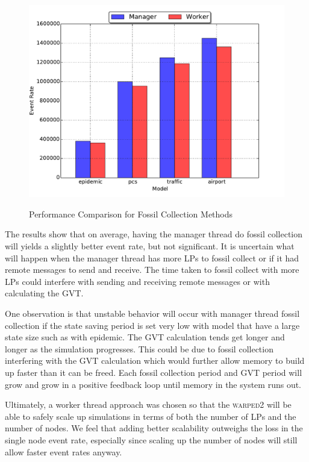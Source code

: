 \documentclass[11pt]{book}
\begin{document}
\begin{figure}
  \centering
  \includegraphics[width=\textwidth,quiet]{figs/fossil_collection/event_rates.pdf}\\
  \caption{Performance Comparison for Fossil Collection Methods}\label{fc_times}
\end{figure}

The results show that on average, having the manager thread do fossil collection will yields a
slightly better event rate, but not significant.  It is uncertain what will happen when the manager
thread has more LPs to fossil collect or if it had remote messages to send and receive.  The time
taken to fossil collect with more LPs could interfere with sending and receiving remote messages or
with calculating the GVT.

One observation is that unstable behavior will occur with manager thread fossil collection
if the state saving period is set very low with model that have a large state size such as with
epidemic.  The GVT calculation tends get longer and longer as the simulation progresses.  This could
be due to fossil collection interfering with the GVT calculation which would further allow memory
to build up faster than it can be freed.  Each fossil collection period and GVT period will grow
and grow in a positive feedback loop until memory in the system runs out.

Ultimately, a worker thread approach was chosen so that the \textsc{warped2} will be able to safely
scale up simulations in terms of both the number of LPs and the number of nodes.  We feel that
adding better scalability outweighs the loss in the single node event rate, especially since scaling
up the number of nodes will still allow faster event rates anyway.
\end{document}
